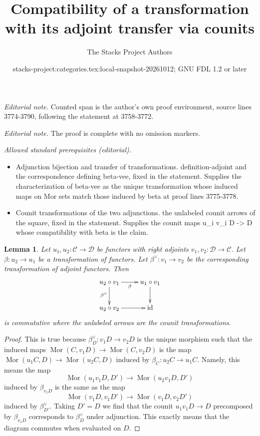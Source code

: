 \documentclass{stacks-project}
\title{Compatibility of a transformation with its adjoint transfer via counits}
\author{The Stacks Project Authors}
\date{stacks-project:categories.tex:local-snapshot-20261012; GNU FDL 1.2 or later}
\theoremstyle{plain}
\newtheorem{lemma}[subsection]{Lemma}
\theoremstyle{definition}
\theoremstyle{remark}
\numberwithin{equation}{subsection}
\def\Mor{\mathop{\mathrm{Mor}}\nolimits}
\begin{document}
\maketitle
\noindent\textit{Editorial note.} Counted span is the author's own proof environment, source lines 3774-3790, following the statement at 3758-3772.\par\medskip
\noindent\textit{Editorial note.} The proof is complete with no omission markers.\par\medskip
\noindent\textit{Allowed standard prerequisites (editorial).}\begin{itemize}
\item Adjunction bijection and transfer of transformations. definition-adjoint and the correspondence defining beta-vee, fixed in the statement. Supplies the characterization of beta-vee as the unique transformation whose induced maps on Mor sets match those induced by beta at proof lines 3775-3778.
\item Counit transformations of the two adjunctions. the unlabeled counit arrows of the square, fixed in the statement. Supplies the counit maps u\_i v\_i D -> D whose compatibility with beta is the claim.
\end{itemize}\medskip
\begin{lemma}
\label{lemma-transformation-between-functors-and-adjoints}
Let $u_1, u_2 : \mathcal{C} \to \mathcal{D}$ be functors with right
adjoints $v_1, v_2 : \mathcal{D} \to \mathcal{C}$. Let $\beta : u_2 \to u_1$
be a transformation of functors. Let $\beta^\vee : v_1 \to v_2$ be
the corresponding transformation of adjoint functors. Then
$$
\xymatrix{
u_2 \circ v_1 \ar[r]_\beta \ar[d]_{\beta^\vee} &
u_1 \circ v_1 \ar[d] \\
u_2 \circ v_2 \ar[r] & \text{id}
}
$$
is commutative where the unlabeled arrows are the counit transformations.
\end{lemma}

\begin{proof}
This is true because $\beta^\vee_D : v_1D \to v_2D$ is the unique
morphism such that the induced maps $\Mor(C, v_1D) \to \Mor(C, v_2D)$
is the map $\Mor(u_1C, D) \to \Mor(u_2C, D)$ induced by
$\beta_C : u_2C \to u_1C$. Namely, this means the map
$$
\Mor(u_1 v_1 D, D') \to \Mor(u_2 v_1 D, D')
$$
induced by $\beta_{v_1 D}$ is the same as the map
$$
\Mor(v_1 D, v_1 D') \to \Mor(v_1 D, v_2 D')
$$
induced by $\beta^\vee_{D'}$. Taking $D' = D$ we find that the counit
$u_1 v_1 D \to D$ precomposed by $\beta_{v_1D}$ corresponds to $\beta^\vee_D$
under adjunction. This exactly means that the diagram commutes when
evaluated on $D$.
\end{proof}
\end{document}
